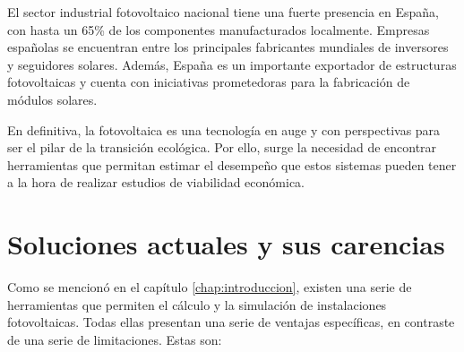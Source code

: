 El sector industrial fotovoltaico nacional tiene una fuerte presencia en España, con hasta un 65\% de los componentes manufacturados localmente. Empresas españolas se encuentran entre los principales fabricantes mundiales de inversores y seguidores solares. Además, España es un importante exportador de estructuras fotovoltaicas y cuenta con iniciativas prometedoras para la fabricación de módulos solares.

En definitiva, la fotovoltaica es una tecnología en auge y con perspectivas para ser el pilar de la transición ecológica. Por ello, surge la necesidad de encontrar herramientas que permitan estimar el desempeño que estos sistemas pueden tener a la hora de realizar estudios de viabilidad económica.

\section{Soluciones actuales y sus carencias}
\label{sec:orgdd7902d}
\label{sec:soluciones-actuales-carencias}
Como se mencionó en el capítulo \ref{chap:introduccion}, existen una serie de herramientas que permiten el cálculo y la simulación de instalaciones fotovoltaicas. Todas ellas presentan una serie de ventajas específicas, en contraste de una serie de limitaciones. Estas son:
